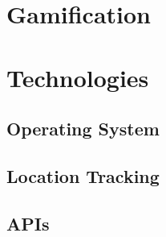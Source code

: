 \section{Gamification}



\section{Technologies}
%
\subsection{Operating System}
%
%
%

\subsection{Location Tracking}


\subsection{APIs}
